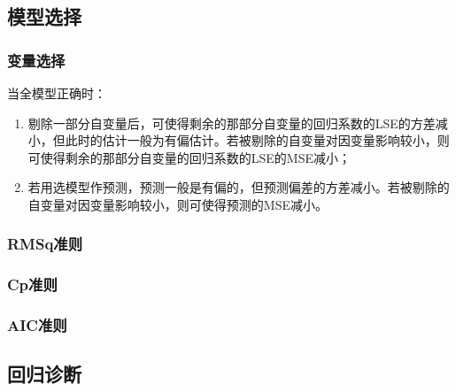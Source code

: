 \subsection{模型选择}
\subsubsection{变量选择}
\begin{theorem}
	当全模型正确时：
	\begin{enumerate}
		\item 剔除一部分自变量后，可使得剩余的那部分自变量的回归系数的LSE的方差减小，但此时的估计一般为有偏估计。若被剔除的自变量对因变量影响较小，则可使得剩余的那部分自变量的回归系数的LSE的MSE减小；
		\item 若用选模型作预测，预测一般是有偏的，但预测偏差的方差减小。若被剔除的自变量对因变量影响较小，则可使得预测的MSE减小。
	\end{enumerate}
\end{theorem}
\subsubsection{RMSq准则}
\subsubsection{Cp准则}
\subsubsection{AIC准则}

\subsection{回归诊断}
